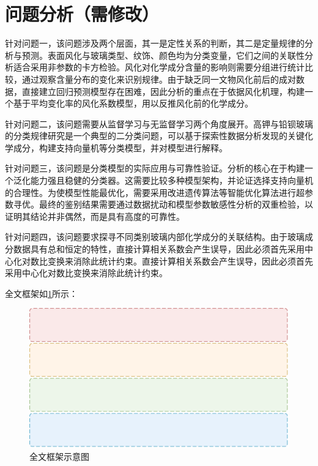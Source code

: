 \section{问题分析（需修改）}

针对问题一，该问题涉及两个层面，其一是定性关系的判断，其二是定量规律的分析与预测。表面风化与玻璃类型、纹饰、颜色均为分类变量，它们之间的关联性分析适合采用非参数的卡方检验。风化对化学成分含量的影响则需要分组进行统计比较，通过观察含量分布的变化来识别规律。由于缺乏同一文物风化前后的成对数据，直接建立回归预测模型存在困难，因此分析的重点在于依据风化机理，构建一个基于平均变化率的风化系数模型，用以反推风化前的化学成分。

针对问题二，该问题需要从监督学习与无监督学习两个角度展开。高钾与铅钡玻璃的分类规律研究是一个典型的二分类问题，可以基于探索性数据分析发现的关键化学成分，构建支持向量机等分类模型，并对模型进行解释。

针对问题三，该问题是分类模型的实际应用与可靠性验证。分析的核心在于构建一个泛化能力强且稳健的分类器。这需要比较多种模型架构，并论证选择支持向量机的合理性。为使模型性能最优化，需要采用改进遗传算法等智能优化算法进行超参数寻优。最终的鉴别结果需要通过数据扰动和模型参数敏感性分析的双重检验，以证明其结论并非偶然，而是具有高度的可靠性。

针对问题四，该问题要求探寻不同类别玻璃内部化学成分的关联结构。由于玻璃成分数据具有总和恒定的特性，直接计算相关系数会产生误导，因此必须首先采用中心化对数比变换来消除此统计约束。直接计算相关系数会产生误导，因此必须首先采用中心化对数比变换来消除此统计约束。

全文框架如\cref{fig:全文框架}所示：

\begin{figure}[H]
	\centering
	\includegraphics[width=\textwidth]{figs/1前置/全文框架.pdf}
	\caption{全文框架示意图}
	\label{fig:全文框架}
\end{figure}


